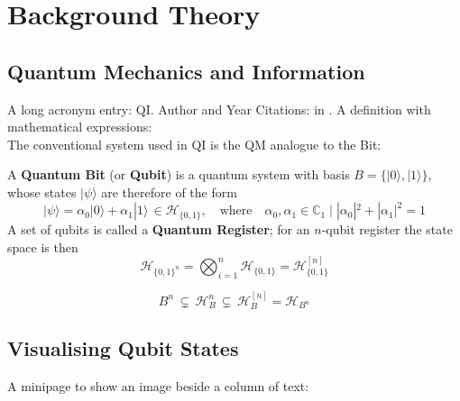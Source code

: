 \section{Background Theory}
\label{sec:BackgroundTheory}



\subsection{Quantum Mechanics and Information}
\label{sec:SubQMandInfo}

A long acronym entry: \acrlong{QI}.
Author and Year Citations: \citeauthor{Shannon1948} in \citeyear{Shannon1948}.
A definition with mathematical expressions:\\


The conventional system used in \gls{QI} is the \gls{QM} analogue to the Bit:
\begin{defn}\label{def:Q_Reg}
    A \textbf{Quantum Bit} (or \textbf{Qubit}) is a quantum system with basis $B = \{|0\rangle,|1\rangle\}$, whose states $|\psi\rangle$ are therefore of the form
    $$
        |\psi\rangle = \alpha_{0}|0\rangle + \alpha_{1}|1\rangle \, \in \mathcal{H}_{\{0,1\}}, \quad \text{where} \quad
        \alpha_{0}, \alpha_{1} \in \mathbb{C}_{1} \; \big| \; |\alpha_{0}|^{2} + |\alpha_{1}|^{2} = 1
    $$
    A set of qubits is called a \textbf{Quantum Register}; for an $n$-qubit register the state space is then
    $$
        \mathcal{H}_{\{0,1\}^{n}} = \bigotimes_{i=1}^{n} \mathcal{H}_{\{0,1\}} = \mathcal{H}_{\{0,1\}}^{[n]}
    $$
\end{defn}


\begin{equation}\label{eq:CompositeInclusions}
    B^{n} \, \subsetneq \,
    \mathcal{H}_{B}^{n} \, \subsetneq \,
    \mathcal{H}_{B}^{[n]} = \mathcal{H}_{B^{n}}
\end{equation}



\subsection{Visualising Qubit States}
\label{sec:SubVisualStates}

A minipage to show an image beside a column of text:\\

